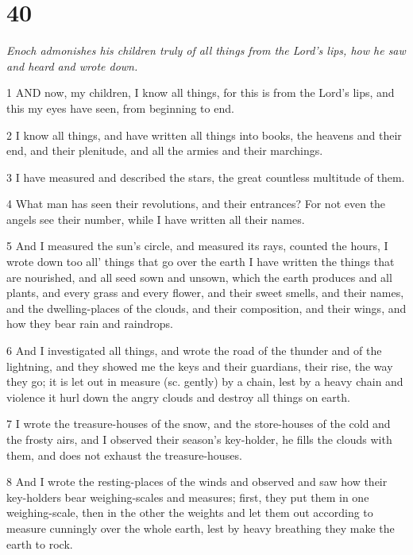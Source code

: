 \chapter{40}

\par \textit{Enoch admonishes his children truly of all things from the Lord's lips, how he saw and heard and wrote down.}

\par 1 AND now, my children, I know all things, for this is from the Lord's lips, and this my eyes have seen, from beginning to end.

\par 2 I know all things, and have written all things into books, the heavens and their end, and their plenitude, and all the armies and their marchings.

\par 3 I have measured and described the stars, the great countless multitude of them.

\par 4 What man has seen their revolutions, and their entrances? For not even the angels see their number, while I have written all their names.

\par 5 And I measured the sun's circle, and measured its rays, counted the hours, I wrote down too all' things that go over the earth I have written the things that are nourished, and all seed sown and unsown, which the earth produces and all plants, and every grass and every flower, and their sweet smells, and their names, and the dwelling-places of the clouds, and their composition, and their wings, and how they bear rain and raindrops.

\par 6 And I investigated all things, and wrote the road of the thunder and of the lightning, and they showed me the keys and their guardians, their rise, the way they go; it is let out in measure (sc. gently) by a chain, lest by a heavy chain and violence it hurl down the angry clouds and destroy all things on earth.

\par 7 I wrote the treasure-houses of the snow, and the store-houses of the cold and the frosty airs, and I observed their season's key-holder, he fills the clouds with them, and does not exhaust the treasure-houses.

\par 8 And I wrote the resting-places of the winds and observed and saw how their key-holders bear weighing-scales and measures; first, they put them in one weighing-scale, then in the other the weights and let them out according to measure cunningly over the whole earth, lest by heavy breathing they make the earth to rock.

